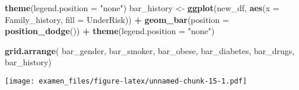 \documentclass[
  10pt,
  spanish,
]{article}
\newenvironment{Shaded}{\begin{snugshade}}{\end{snugshade}}
\newcommand{\DataTypeTok}[1]{\textcolor[rgb]{0.13,0.29,0.53}{#1}}
\newcommand{\KeywordTok}[1]{\textcolor[rgb]{0.13,0.29,0.53}{\textbf{#1}}}
\newcommand{\NormalTok}[1]{#1}
\newcommand{\OperatorTok}[1]{\textcolor[rgb]{0.81,0.36,0.00}{\textbf{#1}}}
\newcommand{\StringTok}[1]{\textcolor[rgb]{0.31,0.60,0.02}{#1}}
\begin{document}
\begin{Shaded}
\begin{Highlighting}[]
\StringTok{    }\KeywordTok{theme}\NormalTok{(}\DataTypeTok{legend.position =} \StringTok{"none"}\NormalTok{)}
\NormalTok{bar\_history \textless{}{-}}\StringTok{ }\KeywordTok{ggplot}\NormalTok{(new\_df, }\KeywordTok{aes}\NormalTok{(}\DataTypeTok{x =}\NormalTok{ Family\_history, }\DataTypeTok{fill =}\NormalTok{ UnderRisk)) }\OperatorTok{+}
\StringTok{    }\KeywordTok{geom\_bar}\NormalTok{(}\DataTypeTok{position =} \KeywordTok{position\_dodge}\NormalTok{()) }\OperatorTok{+}
\StringTok{    }\KeywordTok{theme}\NormalTok{(}\DataTypeTok{legend.position =} \StringTok{"none"}\NormalTok{)}

\KeywordTok{grid.arrange}\NormalTok{(}
\NormalTok{    bar\_gender,}
\NormalTok{    bar\_smoker,}
\NormalTok{    bar\_obese,}
\NormalTok{    bar\_diabetes,}
\NormalTok{    bar\_drugs,}
\NormalTok{    bar\_history)}
\end{Highlighting}
\end{Shaded}

\texttt{[image: examen\_files/figure-latex/unnamed-chunk-15-1.pdf]}
\end{document}
